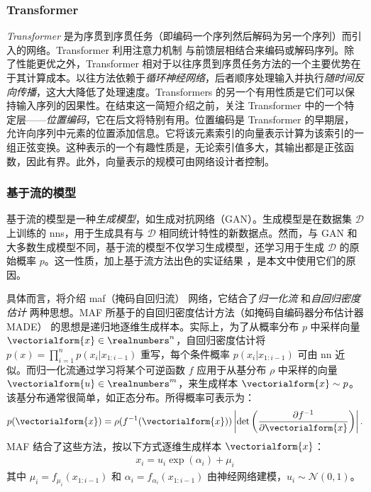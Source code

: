 \subsubsection{Transformer}
\label{subsubsec:transformer}
\emph{Transformer} \cite{vaswani2017attention} 是为序贯到序贯任务（即编码一个序列然后解码为另一个序列）而引入的网络。Transformer 利用注意力机制 \cite{bahdanau2014neural} 与前馈层相结合来编码或解码序列。除了性能更优之外，Transformer 相对于以往序贯到序贯任务方法的一个主要优势在于其计算成本。以往方法依赖于\emph{循环神经网络}，后者顺序处理输入并执行\emph{随时间反向传播}，这大大降低了处理速度。Transformers 的另一个有用性质是它们可以保持输入序列的因果性。在结束这一简短介绍之前，关注 Transformer 中的一个特定层——\emph{位置编码}，它在后文将特别有用。位置编码是 Transformer 的早期层，允许向序列中元素的位置添加信息。它将该元素索引的向量表示计算为该索引的一组正弦变换。这种表示的一个有趣性质是，无论索引值多大，其输出都是正弦函数，因此有界。此外，向量表示的规模可由网络设计者控制。

\subsubsection{基于流的模型}
\label{subsubsec:maf}

基于流的模型是一种\emph{生成模型}，如生成对抗网络（GAN）\cite{goodfellow2014generative}。生成模型是在数据集 $\mathcal{D}$ 上训练的 \glspl{nn}，用于生成具有与 $\mathcal{D}$ 相同统计特性的新数据点。然而，与 GAN 和大多数生成模型不同，基于流的模型不仅学习生成模型，还学习用于生成 $\mathcal{D}$ 的原始概率 $p$。这一性质，加上基于流方法出色的实证结果 \cite{oord2016wavenet,kingma2018glow}，是本文中使用它们的原因。

具体而言，将介绍 \gls{maf}（掩码自回归流）\cite{papamakarios2017masked} 网络，它结合了\emph{归一化流} \cite{rezende2015variational} 和\emph{自回归密度估计} \cite{uria2016neural} 两种思想。MAF 所基于的自回归密度估计方法（如掩码自编码器分布估计器 MADE）\cite{germain2015made} 的思想是递归地逐维生成样本。实际上，为了从概率分布 $p$ 中采样向量 $\vectorialform{x}\in\realnumbers^n$，自回归密度估计将 $p(x)=\prod\nolimits_{i=1}^{n}p(x_i\vert x_{1:i-1})$ 重写，每个条件概率 $p(x_i\vert x_{1:i-1})$ 可由 \gls{nn} 近似。而归一化流通过学习将某个可逆函数 $f$ 应用于从基分布 $\rho$ 中采样的向量 $\vectorialform{u}\in\realnumbers^m$，来生成样本 $\vectorialform{x}\sim p$。该基分布通常很简单，如正态分布。所得概率可表示为：
\begin{align}
\label{eq:p_inverted_maf}
    p(\vectorialform{x}) = \rho(f^{-1}(\vectorialform{x})) \left\lvert \det\left(\frac{\partial f^{-1}}{\partial \vectorialform{x}}\right)\right\rvert.
\end{align}
MAF 结合了这些方法，按以下方式逐维生成样本 $\vectorialform{x}$：
\begin{align}
\label{eq:sampling_maf}
    x_i = u_i \exp(\alpha_i) + \mu_i
\end{align}
其中 $\mu_i=f_{\mu_i}(x_{1:i-1})$ 和 $\alpha_i=f_{\alpha_i}(x_{1:i-1})$ 由神经网络建模，$u_i\sim\mathcal{N}(0,1)$。

